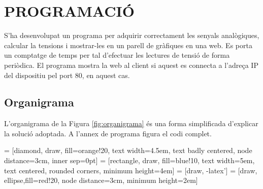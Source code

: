 \chapter{\uppercase{Programació}}
S'ha desenvolupat un programa per adquirir correctament les senyals analògiques, calcular la tensions i mostrar-les en un parell de gràfiques en una web. Es porta un comptatge de temps per tal d'efectuar les lectures de tensió de forma periòdica. El programa mostra la web al client si aquest es connecta a l'adreça IP del dispositiu pel port 80, en aquest cas.
\section{Organigrama}
L'organigrama de la Figura \ref{fig:organigrama} és una forma simplificada d'explicar la solució adoptada. A l'annex de programa figura el codi complet.


 = [diamond, draw, fill=orange!20, 
    text width=4.5em, text badly centered, node distance=3cm, inner sep=0pt]
 = [rectangle, draw, fill=blue!10, 
    text width=5em, text centered, rounded corners, minimum height=4em]
 = [draw, -latex']
 = [draw, ellipse,fill=red!20, node distance=3cm,
    minimum height=2em]
    
